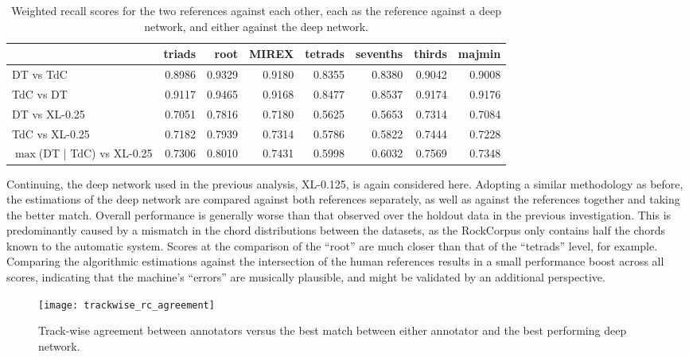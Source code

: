 \begin{table}[t]
\begin{center}
\scriptsize
\caption{Weighted recall scores for the two references against each other, each as the reference against a deep network, and either against the deep network.}

\begin{tabular}{lrrrrrrr}
\hline
         &   triads &   root &   MIREX &   tetrads &   sevenths &   thirds &   majmin \\
\hline
DT vs TdC  &  0.8986 & 0.9329 &  0.9180  &   0.8355  &    0.8380  &   0.9042  &  0.9008 \\
TdC vs DT &   0.9117 & 0.9465 &  0.9168  &   0.8477  &    0.8537 &   0.9174 &    0.9176 \\
\hline
DT vs XL-0.25  &   0.7051 & 0.7816 &  0.7180  &   0.5625   &   0.5653  &  0.7314  &  0.7084 \\
TdC vs XL-0.25  & 0.7182 & 0.7939 & 0.7314  &   0.5786  &    0.5822 &   0.7444 &   0.7228 \\
\hline
$\max$(DT | TdC) vs XL-0.25 & 0.7306 & 0.8010 & 0.7431  &   0.5998  &    0.6032 &   0.7569  &  0.7348\\
\hline
\end{tabular}
\label{tab:rc_agreement}
\end{center}
\end{table}

Continuing, the deep network used in the previous analysis, XL-0.125, is again considered here.
Adopting a similar methodology as before, the estimations of the deep network are compared against both references separately, as well as against the references together and taking the better match.
Overall performance is generally worse than that observed over the holdout data in the previous investigation.
This is predominantly caused by a mismatch in the chord distributions between the datasets, as the RockCorpus only contains half the chords known to the automatic system.
Scores at the comparison of the ``root'' are much closer than that of the ``tetrads'' level, for example.
Comparing the algorithmic estimations against the intersection of the human references results in a small performance boost across all scores, indicating that the machine's ``errors'' are musically plausible, and might be validated by an additional perspective.


\begin{figure}[t!]
\centering
\texttt{[image: trackwise\_rc\_agreement]}
\caption{Track-wise agreement between annotators versus the best match between either annotator and the best performing deep network.}
\label{fig:trackwise_rc_agreement}
\end{figure}

